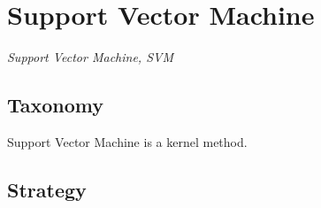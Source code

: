 
\section{Support Vector Machine} 
\label{sec:svm}

\emph{Support Vector Machine, SVM}

\subsection{Taxonomy}
Support Vector Machine is a kernel method.

\subsection{Strategy}

